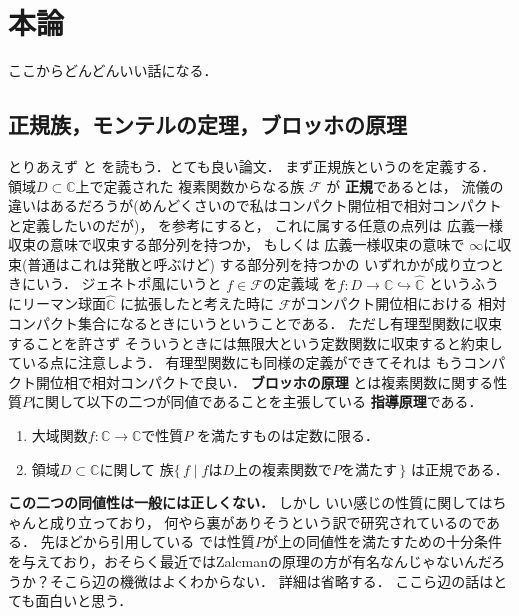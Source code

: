 \documentclass[leqno, a4paper, 12pt]{jsarticle}
\newcommand{\cc}{\mathbb{C}}
\begin{document}
\section{本論}
ここからどんどんいい話になる．
\subsection{正規族，モンテルの定理，ブロッホの原理}

とりあえず
\cite{MR0379852}
と
\cite{MR2241035}
を読もう．とても良い論文．
まず正規族というのを定義する．
領域$D\subset \cc$上で定義された
複素関数からなる族
$\mathcal{F}$
が
\textbf{正規}であるとは，
流儀の違いはあるだろうが(めんどくさいので私はコンパクト開位相で相対コンパクトと定義したいのだが)，
\cite{MR0379852}を参考にすると，
これに属する任意の点列は
広義一様収束の意味で収束する部分列を持つか，
もしくは
広義一様収束の意味で
$\infty$に収束(普通はこれは発散と呼ぶけど)
する部分列を持つかの
いずれかが成り立つときにいう．
ジェネトポ風にいうと
$f\in \mathcal{F}$の定義域
を$f\colon D\to \cc\hookrightarrow\hat{\cc}$
というふうにリーマン球面$\hat{\cc}$
に拡張したと考えた時に
$\mathcal{F}$がコンパクト開位相における
相対コンパクト集合になるときにいうということである．
ただし有理型関数に収束することを許さず
そういうときには無限大という定数関数に収束すると約束している点に注意しよう．
有理型関数にも同様の定義ができてそれは
もうコンパクト開位相で相対コンパクトで良い．
\textbf{ブロッホの原理}
とは複素関数に関する性質$P$に関して以下の二つが同値であることを主張している
\textbf{指導原理}である．
\begin{enumerate}
\item 
大域関数$f\colon \cc\to \cc$で性質$P$
を満たすものは定数に限る．
\item 
領域$D\subset \cc$に関して
族$\{\, f\mid \text{$f$は$D$上の複素関数で$P$を満たす}\, \}$
は正規である．
\end{enumerate}
\textbf{この二つの同値性は一般には正しくない．}
しかし
いい感じの性質に関してはちゃんと成り立っており，
何やら裏がありそうという訳で研究されているのである．
先ほどから引用している
\cite{MR0379852}
では性質$P$が上の同値性を満たすための十分条件を与えており，おそらく最近ではZalcmanの原理の方が有名なんじゃないんだろうか？そこら辺の機微はよくわからない．
詳細は省略する．
ここら辺の話はとても面白いと思う．
\end{document}
